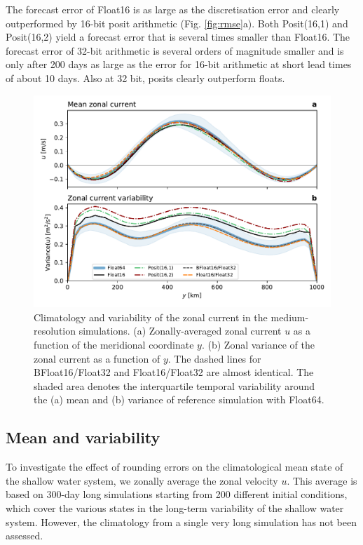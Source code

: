 The forecast error of Float16 is as large as the discretisation error and
clearly outperformed by 16-bit posit arithmetic (Fig. \ref{fig:rmse}a).
Both Posit(16,1) and Posit(16,2) yield a forecast error that is several times
smaller than Float16. The forecast error of 32-bit arithmetic is several orders
of magnitude smaller and is only after 200 days as large as the error for 16-bit
arithmetic at short lead times of about 10 days. Also at 32 bit, posits clearly
outperform floats.

\begin{figure}
\includegraphics[width=1\textwidth]{Figures/swm/meanvar_u.pdf}
\caption{Climatology and variability of the zonal current in the medium-resolution
simulations. (a) Zonally-averaged zonal current $u$ as a function of the meridional
coordinate $y$. (b) Zonal variance of the zonal current as a function of $y$.
The dashed lines for BFloat16/Float32 and Float16/Float32 are almost identical.
The shaded area denotes the interquartile temporal variability around the (a) mean and
(b) variance of reference simulation with Float64.}
\label{fig:mean}
\end{figure}

\subsection{Mean and variability}

To investigate the effect of rounding errors on the climatological mean state of
the shallow water system, we zonally average the zonal velocity $u$. This average
is based on 300-day long simulations starting from 200 different initial conditions,
which cover the various states in the long-term variability of the shallow water system.
However, the climatology from a single very long simulation has not been assessed.

